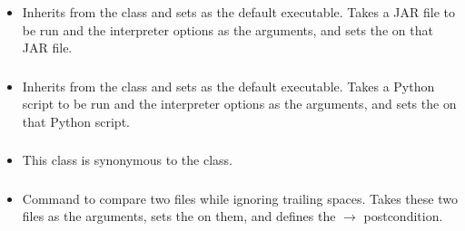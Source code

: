 \subsubsection*{}\label{subsec:RunJar}

\begin{itemize}[label={}]
    \item Inherits from the \hyperref[subsec:Run]{} class and sets  as the default
          executable.
          Takes a JAR file to be run and the interpreter options as the arguments, and sets the
          \hyperref[subsec:FileExistsPrerequisite]{} on that JAR file.
\end{itemize}

\subsubsection*{}\label{subsec:RunPython}

\begin{itemize}[label={}]
    \item Inherits from the \hyperref[subsec:Run]{} class and sets  as the default
          executable.
          Takes a Python script to be run and the interpreter options as the arguments, and sets the
          \hyperref[subsec:FileExistsPrerequisite]{} on that Python script.
\end{itemize}

\subsubsection*{}\label{subsec:RunShell}

\begin{itemize}[label={}]
    \item This class is synonymous to the \hyperref[subsec:Run]{} class.
\end{itemize}

\subsubsection*{}\label{subsec:Diff}

\begin{itemize}[label={}]
    \item Command to compare two files while ignoring trailing spaces.
          Takes these two files as the arguments, sets the
          \hyperref[subsec:FileExistsPrerequisite]{} on them, and defines the
          \hyperref[subsec:ExitCodePostcondition]{} $\rightarrow$ 
          postcondition.
\end{itemize}

